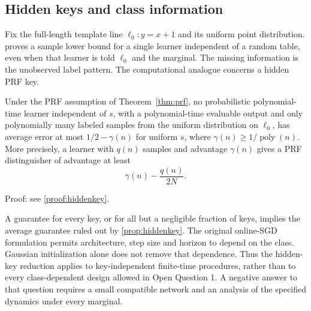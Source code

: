 \subsection{Hidden keys and class information}\label{sec:secret}
Fix the full-length template line $\ell_0:y=x+1$ and its uniform point distribution.  proves a sample lower bound for a single learner independent of a random table, even when that learner is told $\ell_0$ and the marginal. The missing information is the unobserved label pattern. The computational analogue concerns a hidden PRF key.

\begin{proposition}\label{prop:hiddenkey}
Under the PRF assumption of Theorem~\ref{thm:prf}, no probabilistic polynomial-time learner independent of $s$, with a polynomial-time evaluable output and only polynomially many labeled samples from the uniform distribution on $\ell_0$, has average error at most $1/2-\gamma(n)$ for uniform $s$, where $\gamma(n)\ge1/\operatorname{poly}(n)$. More precisely, a learner with $q(n)$ samples and advantage $\gamma(n)$ gives a PRF distinguisher of advantage at least
\[
 \gamma(n)-\frac{q(n)}{2N}.
\]
\end{proposition}

\noindent Proof: see \cref{proof:hiddenkey}.\par

A guarantee for every key, or for all but a negligible fraction of keys, implies the average guarantee ruled out by \cref{prop:hiddenkey}. The original online-SGD formulation permits architecture, step size and horizon to depend on the class. Gaussian initialization alone does not remove that dependence. Thus the hidden-key reduction applies to key-independent finite-time procedures, rather than to every class-dependent design allowed in Open Question 1. A negative answer to that question requires a small compatible network and an analysis of the specified dynamics under every marginal.
